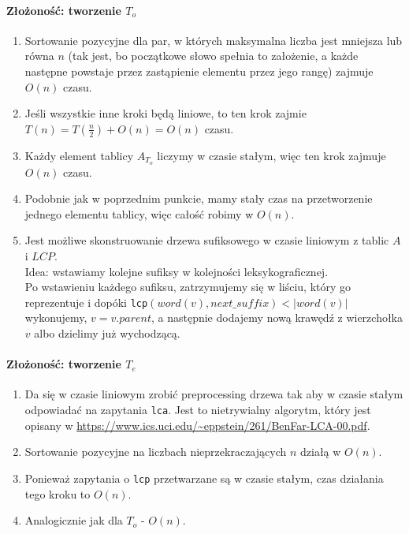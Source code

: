 \paragraph{Złożoność: tworzenie $T_o$}
\begin{enumerate}
\item Sortowanie pozycyjne dla par, w których maksymalna liczba jest mniejsza lub równa $n$ (tak jest, bo początkowe słowo spełnia to założenie, a każde następne powstaje przez zastąpienie elementu przez jego rangę) zajmuje $O(n)$ czasu.
\item Jeśli wszystkie inne kroki będą liniowe, to ten krok zajmie $T(n) = T(\frac{n}{2}) + O(n) = O(n)$ czasu.
\item Każdy element tablicy $A_{T_o}$ liczymy w czasie stałym, więc ten krok zajmuje $O(n)$ czasu.
\item Podobnie jak w poprzednim punkcie, mamy stały czas na przetworzenie jednego elementu tablicy, więc całość robimy w $O(n)$.
\item Jest możliwe skonstruowanie drzewa sufiksowego w czasie liniowym z tablic $A$ i $LCP$.\\ Idea: wstawiamy kolejne sufiksy w kolejności leksykograficznej. \\
Po wstawieniu każdego sufiksu, zatrzymujemy się w liściu, który go reprezentuje i dopóki \verb|lcp|$(word(v), next\_suffix) < |word(v)|$ wykonujemy, $v = v.parent$, a następnie dodajemy nową krawędź z wierzchołka $v$ albo dzielimy już wychodzącą.
\end{enumerate}
\paragraph{Złożoność: tworzenie $T_e$}
\begin{enumerate}
\item Da się w czasie liniowym zrobić preprocessing drzewa tak aby w czasie stałym odpowiadać na zapytania \verb|lca|. Jest to nietrywialny algorytm, który jest opisany w \url{https://www.ics.uci.edu/~eppstein/261/BenFar-LCA-00.pdf}.
\item Sortowanie pozycyjne na liczbach nieprzekraczających $n$ działą w $O(n)$.
\item Ponieważ zapytania o \verb|lcp| przetwarzane są w czasie stałym, czas działania tego kroku to $O(n)$.
\item Analogicznie jak dla $T_o$ - $O(n)$.
\end{enumerate}

